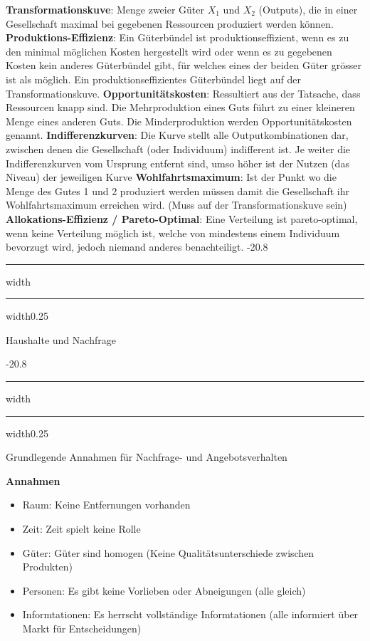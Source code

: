 \documentclass[8pt, landscape, fleqn]{scrartcl}
\makeatletter
\renewcommand{\section}{\@startsection{section}{1}{0mm}%
{-2\baselineskip}{0.8\baselineskip}%
{\hrule depth 0.2pt width\columnwidth\hrule depth1.5pt
width0.25\columnwidth\vspace*{1.2em}\Large\bfseries\rmfamily}}
\renewcommand{\subsection}{\@startsection{subsection}{1}{0mm}%
{-2\baselineskip}{0.8\baselineskip}%
{\hrule depth 0.2pt width\columnwidth\hrule depth0.75pt
width0.25\columnwidth\vspace*{1.2em}\large\bfseries\rmfamily}}
\makeatother
\begin{document}
\begin{multicols*}{3}
\textbf{Transformationskuve}: Menge zweier Güter $X_1$ und $X_2$ (Outputs), die in einer Gesellschaft maximal bei gegebenen Ressourcen produziert werden können. \newline \newline
\textbf{Produktions-Effizienz}: Ein Güterbündel ist produktionseffizient, wenn es zu den minimal möglichen Kosten hergestellt wird oder wenn es zu gegebenen Kosten kein anderes Güterbündel gibt, für welches eines der beiden Güter grösser ist als möglich. Ein produktionseffizientes Güterbündel liegt auf der Transformationskuve. \newline \newline 
\textbf{Opportunitätskosten}: Ressultiert aus der Tatsache, dass Ressourcen knapp sind. Die Mehrproduktion eines Guts führt zu einer kleineren Menge eines anderen Guts. Die Minderproduktion werden Opportunitätskosten genannt. \newline \newline
\textbf{Indifferenzkurven}: Die Kurve stellt alle Outputkombinationen dar, zwischen denen die Gesellschaft (oder Individuum) indifferent ist. Je weiter die Indifferenzkurven vom Ursprung entfernt sind, umso höher ist der Nutzen (das Niveau) der jeweiligen Kurve \newline \newline
\textbf{Wohlfahrtsmaximum}: Ist der Punkt wo die Menge des Gutes 1 und 2 produziert werden müssen damit die Gesellschaft ihr Wohlfahrtsmaximum erreichen wird. (Muss auf der Transformationskuve sein) \newline \newline
\textbf{Allokations-Effizienz / Pareto-Optimal}: Eine Verteilung ist pareto-optimal, wenn keine Verteilung möglich ist, welche von mindestens einem Individuum bevorzugt wird, jedoch niemand anderes benachteiligt.  
\section{Haushalte und Nachfrage}

\subsection{Grundlegende Annahmen für Nachfrage- und Angebotsverhalten}

\textbf{Annahmen}
\begin{itemize}
    \item Raum: Keine Entfernungen vorhanden 
    \item Zeit: Zeit spielt keine Rolle 
    \item Güter: Güter sind homogen (Keine Qualitätsunterschiede zwischen Produkten)
    \item Personen: Es gibt keine Vorlieben oder Abneigungen (alle gleich)
    \item Informtationen: Es herrscht vollständige Informtationen (alle informiert über Markt für Entscheidungen)
\end{itemize}


\end{multicols*}
\end{document}
